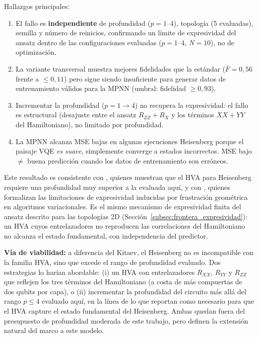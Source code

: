 \documentclass[11pt,a4paper,spanish]{book}
\begin{document}
Hallazgos principales:
\begin{enumerate}
    \item El fallo es \textbf{independiente} de profundidad ($p = 1$--$4$), topología (5 evaluadas), semilla y número de reinicios, confirmando un límite de expresividad del ansatz dentro de las configuraciones evaluadas ($p = 1$--$4$, $N = 10$), no de optimización.
    \item La variante transversal muestra mejores fidelidades que la estándar ($\bar{F} = 0,56$ frente a $\leq 0,11$) pero sigue siendo insuficiente para generar datos de entrenamiento válidos para la MPNN (umbral: fidelidad $\geq 0,93$).
    \item Incrementar la profundidad ($p = 1 \to 4$) no recupera la expresividad: el fallo es estructural (desajuste entre el ansatz $R_{ZZ} + R_X$ y los términos $XX + YY$ del Hamiltoniano), no limitado por profundidad.
    \item La MPNN alcanza MSE bajas en algunas ejecuciones Heisenberg porque el paisaje VQE \emph{es suave}, simplemente converge a estados incorrectos. MSE bajo $\neq$ buena predicción cuando los datos de entrenamiento son erróneos.
\end{enumerate}

Este resultado es consistente con \citet{wiersema2020}, quienes muestran que el HVA para Heisenberg requiere una profundidad muy superior a la evaluada aquí, y con \citet{huang2026frustration}, quienes formalizan las limitaciones de expresividad inducidas por frustración geométrica en algoritmos variacionales. Es el mismo mecanismo de expresividad finita del ansatz descrito para las topologías 2D (Sección~\ref{subsec:frontera_expresividad}): un HVA cuyos entrelazadores no reproducen las correlaciones del Hamiltoniano no alcanza el estado fundamental, con independencia del predictor.

\textbf{Vía de viabilidad:} a diferencia del Kitaev, el Heisenberg no es incompatible con la familia HVA, sino que excede el rango de profundidad evaluado. Dos estrategias lo harían abordable: (i) un HVA con entrelazadores $R_{XX}$, $R_{YY}$ y $R_{ZZ}$ que reflejen los tres términos del Hamiltoniano (a costa de más compuertas de dos qubits por capa), o (ii) incrementar la profundidad del circuito más allá del rango $p \leq 4$ evaluado aquí, en la línea de lo que \citet{wiersema2020} reportan como necesario para que el HVA capture el estado fundamental del Heisenberg. Ambas quedan fuera del presupuesto de profundidad moderada de este trabajo, pero definen la extensión natural del marco a este modelo.
\end{document}

